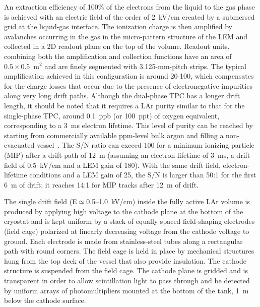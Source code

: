 
An extraction efficiency of 100\% of the electrons from the liquid to
the gas phase is achieved with an electric field of the order of
2~kV/cm created by a submersed grid at the liquid-gas interface. The
ionization charge is then amplified by avalanches occurring in the gas
in the micro-pattern structure of the LEM and collected in a
2D readout plane on the top of the  volume. Readout units,
combining both the amplification and collection functions have an area
of $0.5\times 0.5$~m$^2$ and are finely segmented with 3.125-mm-pitch 
strips. The typical amplification achieved in this configuration
is around 20-100, 
which %
compensates for the charge losses that occur due to
the presence of electronegative impurities along very long drift
paths. Although the dual-phase TPC has a longer drift length, it should
be noted that it requires a LAr purity similar to that
for the single-phase TPC, 
around 0.1~ppb (or 100~ppt) of oxygen equivalent, corresponding to a 3~ms electron lifetime.
This level of purity can be reached by starting
from commercially available ppm-level bulk argon and filling a
non-evacuated vessel~\cite{WA105_TDR}.  The S/N ratio can exceed 100
for a minimum ionizing particle (MIP) after a drift path of
12~m (assuming an electron lifetime of 3~ms, a drift field of
0.5~kV/cm and a LEM gain of 180). With the same drift field, 
electron-lifetime conditions and a LEM gain of  25, the S/N is larger
than 50:1 for the first 6~m of drift; it reaches 14:1 for MIP tracks
after 12~m of drift. 

The single  drift field (E${\simeq}$0.5--1.0~kV/cm) inside the fully active
LAr volume is produced by applying high voltage to the cathode plane
at the bottom of the cryostat and is kept uniform by a stack of
equally spaced field-shaping electrodes (field cage) polarized at
linearly decreasing voltage from the cathode voltage to ground. Each
electrode is made from stainless-steel tubes 
 along a
rectangular path with round corners. The field cage is held in place
by mechanical structures hung from the top deck of the
vessel that also provide insulation.  The cathode structure is suspended from the field cage. The
cathode plane is gridded  and is transparent in order to allow scintillation light to pass through and be
detected by uniform arrays of photomultipliers mounted
at the bottom of the tank, 1~m below the cathode surface. 

